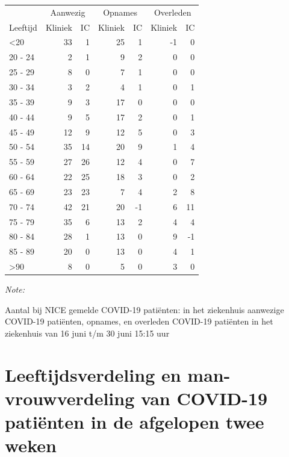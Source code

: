 \documentclass[
  english,
  man,floatsintext]{apa6}
\begin{document}
\begin{table}
\centering\begingroup\fontsize{10}{12}\selectfont

\begin{threeparttable}
\begin{tabular}{lrrrrrr}
\toprule
\multicolumn{1}{c}{ } & \multicolumn{2}{c}{Aanwezig} & \multicolumn{2}{c}{Opnames} & \multicolumn{2}{c}{Overleden} \\
\cmidrule(l{3pt}r{3pt}){2-3} \cmidrule(l{3pt}r{3pt}){4-5} \cmidrule(l{3pt}r{3pt}){6-7}
Leeftijd & Kliniek & IC & Kliniek & IC & Kliniek & IC\\
\midrule
<20 & 33 & 1 & 25 & 1 & -1 & 0\\
20 - 24 & 2 & 1 & 9 & 2 & 0 & 0\\
25 - 29 & 8 & 0 & 7 & 1 & 0 & 0\\
30 - 34 & 3 & 2 & 4 & 1 & 0 & 1\\
35 - 39 & 9 & 3 & 17 & 0 & 0 & 0\\
40 - 44 & 9 & 5 & 17 & 2 & 0 & 1\\
45 - 49 & 12 & 9 & 12 & 5 & 0 & 3\\
50 - 54 & 35 & 14 & 20 & 9 & 1 & 4\\
55 - 59 & 27 & 26 & 12 & 4 & 0 & 7\\
60 - 64 & 22 & 25 & 18 & 3 & 0 & 2\\
65 - 69 & 23 & 23 & 7 & 4 & 2 & 8\\
70 - 74 & 42 & 21 & 20 & -1 & 6 & 11\\
75 - 79 & 35 & 6 & 13 & 2 & 4 & 4\\
80 - 84 & 28 & 1 & 13 & 0 & 9 & -1\\
85 - 89 & 20 & 0 & 13 & 0 & 4 & 1\\
>90 & 8 & 0 & 5 & 0 & 3 & 0\\
\bottomrule
\end{tabular}
\begin{tablenotes}
\item \textit{Note: } 
\item Aantal bij NICE gemelde COVID-19 patiënten: in het ziekenhuis aanwezige COVID-19 patiënten, opnames, en overleden COVID-19 patiënten in het ziekenhuis van 16 juni t/m 30 juni 15:15 uur
\end{tablenotes}
\end{threeparttable}
\endgroup{}
\end{table}

\newpage

\hypertarget{leeftijdsverdeling-en-man-vrouwverdeling-van-covid-19-patiuxebnten-in-de-afgelopen-twee-weken}{%
\section{Leeftijdsverdeling en man-vrouwverdeling van COVID-19 patiënten in de afgelopen twee weken}\label{leeftijdsverdeling-en-man-vrouwverdeling-van-covid-19-patiuxebnten-in-de-afgelopen-twee-weken}}
\end{document}
